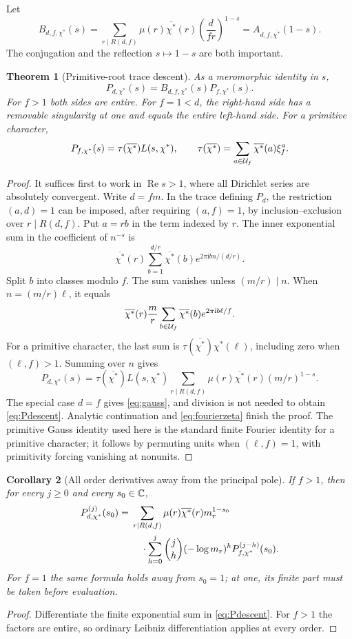 \documentclass[11pt]{article}
\numberwithin{equation}{section}
\newtheorem{theorem}{Theorem}[section]
\newtheorem{corollary}[theorem]{Corollary}
\theoremstyle{definition}\newtheorem{definition}[theorem]{Definition}
\theoremstyle{remark}\newtheorem{remark}[theorem]{Remark}
\DeclareMathOperator{\Rea}{Re}
\newcommand{\ii}{\mathrm i}
\newcommand{\ch}{\chi^*}
\newcommand{\bch}{\overline{\chi^*}}
\begin{document}
Let
\begin{equation}\label{eq:B}
B_{d,f,\ch}(s)=
\sum_{r\mid R(d,f)}\mu(r)\bch(r)
\left(\frac{d}{fr}\right)^{1-s}
=A_{d,f,\overline{\ch}}(1-s).
\end{equation}
The conjugation and the reflection $s\mapsto1-s$ are both important.

\begin{theorem}[Primitive-root trace descent]\label{thm:polylogdescent}
As a meromorphic identity in $s$,
\begin{equation}\label{eq:Pdescent}
P_{d,\ch}(s)=B_{d,f,\ch}(s)P_{f,\ch}(s).
\end{equation}
For $f>1$ both sides are entire. For $f=1<d$, the right-hand side has a
removable singularity at one and equals the entire left-hand side.
For a primitive character,
\begin{equation}\label{eq:gauss}
P_{f,\ch}(s)=\tau(\bch)L(s,\ch),\qquad
\tau(\bch)=\sum_{a\in\U_f}\bch(a)\xi_f^a.
\end{equation}
\end{theorem}

\begin{proof}
It suffices first to work in $\Rea s>1$, where all Dirichlet series are
absolutely convergent. Write $d=fm$. In the trace defining $P_d$, the
restriction $(a,d)=1$ can be imposed, after requiring $(a,f)=1$, by
inclusion--exclusion over $r\mid R(d,f)$. Put $a=rb$ in the term indexed
by $r$. The inner exponential sum in the coefficient of $n^{-s}$ is
\[
\bch(r)\sum_{b=1}^{d/r}\bch(b)e^{2\pi\ii bn/(d/r)}.
\]
Split $b$ into classes modulo $f$. The sum vanishes unless $(m/r)\mid n$.
When $n=(m/r)\ell$, it equals
\[
\bch(r)\frac mr
\sum_{b\in\U_f}\bch(b)e^{2\pi\ii b\ell/f}.
\]
For a primitive character, the last sum is
$\tau(\bch)\ch(\ell)$, including zero when $(\ell,f)>1$.
Summing over $n$ gives
\[
P_{d,\ch}(s)=\tau(\bch)L(s,\ch)
\sum_{r\mid R(d,f)}\mu(r)\bch(r)(m/r)^{1-s}.
\]
The special case $d=f$ gives \eqref{eq:gauss}, and division is not needed
to obtain \eqref{eq:Pdescent}. Analytic continuation and
\eqref{eq:fourierzeta} finish the proof. The primitive Gauss identity used
here is the standard finite Fourier identity for a primitive character;
it follows by permuting units when $(\ell,f)=1$, with primitivity forcing
vanishing at nonunits.
\end{proof}

\begin{corollary}[All order derivatives away from the principal pole]
If $f>1$, then for every $j\ge0$ and every $s_0\in\mathbb C$,
\begin{align}\label{eq:Pjets}
P_{d,\ch}^{(j)}(s_0)
={}&\sum_{r\mid R(d,f)}\mu(r)\bch(r)m_r^{1-s_0}\notag\\
&\quad\cdot\sum_{h=0}^{j}\binom jh(-\log m_r)^h
P_{f,\ch}^{(j-h)}(s_0).
\end{align}
For $f=1$ the same formula holds away from $s_0=1$; at one, its finite
part must be taken before evaluation.
\end{corollary}
\begin{proof}
Differentiate the finite exponential sum in \eqref{eq:Pdescent}. For
$f>1$ the factors are entire, so ordinary Leibniz differentiation applies
at every order.
\end{proof}
\end{document}
